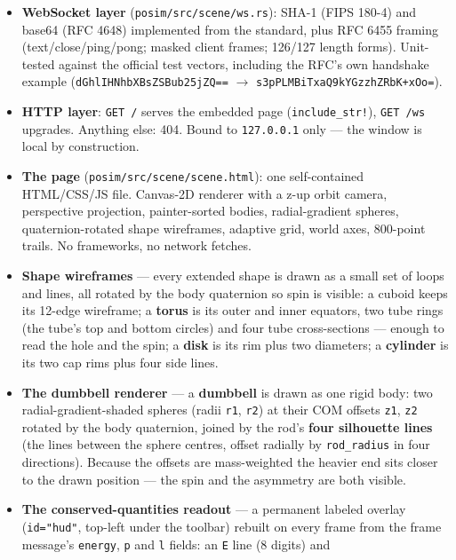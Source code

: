 \documentclass[11pt]{article}
\newcommand{\code}[1]{\texttt{#1}}
\begin{document}
\begin{itemize}
\item \textbf{WebSocket layer} (\code{posim/src/scene/ws.rs}): SHA-1
      (FIPS 180-4) and base64 (RFC 4648) implemented from the
      standard, plus RFC 6455 framing (text/close/ping/pong; masked
      client frames; 126/127 length forms). Unit-tested against the
      official test vectors, including the RFC's own handshake example
      (\code{dGhlIHNhbXBsZSBub25jZQ==} $\to$
      \code{s3pPLMBiTxaQ9kYGzzhZRbK+xOo=}).
\item \textbf{HTTP layer}: \code{GET /} serves the embedded page
      (\code{include\_str!}), \code{GET /ws} upgrades. Anything else:
      404. Bound to \code{127.0.0.1} only --- the window is local by
      construction.
\item \textbf{The page} (\code{posim/src/scene/scene.html}): one
      self-contained HTML/CSS/JS file. Canvas-2D renderer with a z-up
      orbit camera, perspective projection, painter-sorted bodies,
      radial-gradient spheres, quaternion-rotated shape wireframes,
      adaptive grid, world axes, 800-point trails. No frameworks, no
      network fetches.
\item \textbf{Shape wireframes} --- every extended shape is drawn as
      a small set of loops and lines, all rotated by the body
      quaternion so spin is visible: a cuboid keeps its 12-edge
      wireframe; a \textbf{torus} is its outer and inner equators,
      two tube rings (the tube's top and bottom circles) and four
      tube cross-sections --- enough to read the hole and the spin; a
      \textbf{disk} is its rim plus two diameters; a
      \textbf{cylinder} is its two cap rims plus four side lines.
\item \textbf{The dumbbell renderer} --- a \textbf{dumbbell} is drawn
      as one rigid body: two radial-gradient-shaded spheres (radii
      \code{r1}, \code{r2}) at their COM offsets \code{z1}, \code{z2}
      rotated by the body quaternion, joined by the rod's
      \textbf{four silhouette lines} (the lines between the sphere
      centres, offset radially by \code{rod\_radius} in four
      directions). Because the offsets are mass-weighted the heavier
      end sits closer to the drawn position --- the spin and the
      asymmetry are both visible.
\item \textbf{The conserved-quantities readout} --- a permanent
      labeled overlay (\code{id="hud"}, top-left under the toolbar)
      rebuilt on every frame from the frame message's \code{energy},
      \code{p} and \code{l} fields: an \code{E} line (8 digits) and

\end{itemize}
\end{document}
